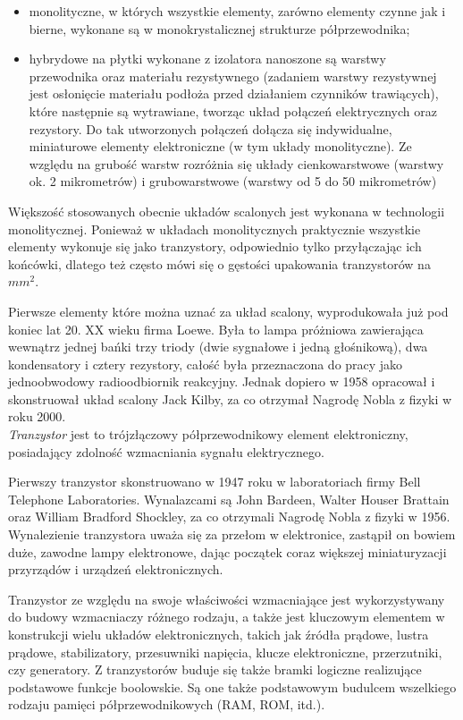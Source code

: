 \documentclass[a4paper,11pt]{article}
\begin{document}
\begin{itemize}
\item monolityczne, w których wszystkie elementy, zarówno elementy czynne jak i bierne, wykonane są w monokrystalicznej strukturze półprzewodnika;

\item hybrydowe na płytki wykonane z izolatora nanoszone są warstwy przewodnika oraz materiału rezystywnego (zadaniem warstwy rezystywnej jest osłonięcie materiału podłoża przed działaniem czynników trawiących), które następnie są wytrawiane, tworząc układ połączeń elektrycznych oraz rezystory. Do tak utworzonych połączeń dołącza się indywidualne, miniaturowe elementy elektroniczne (w tym układy monolityczne). Ze względu na grubość warstw rozróżnia się układy cienkowarstwowe (warstwy ok. 2 mikrometrów) i grubowarstwowe (warstwy od 5 do 50 mikrometrów)
\end{itemize}

Większość stosowanych obecnie układów scalonych jest wykonana w technologii monolitycznej. Ponieważ w układach monolitycznych praktycznie wszystkie elementy wykonuje się jako tranzystory, odpowiednio tylko przyłączając ich końcówki, dlatego też często mówi się o gęstości upakowania tranzystorów na $mm^2$.

Pierwsze elementy które można uznać za układ scalony, wyprodukowała już pod koniec lat 20. XX wieku firma Loewe. Była to lampa próżniowa zawierająca wewnątrz jednej bańki trzy triody (dwie sygnałowe i jedną głośnikową), dwa kondensatory i cztery rezystory, całość była przeznaczona do pracy jako jednoobwodowy radioodbiornik reakcyjny. Jednak dopiero w 1958 opracował i skonstruował układ scalony Jack Kilby, za co otrzymał Nagrodę Nobla z fizyki w roku 2000.\\

\emph{Tranzystor} jest to trójzłączowy półprzewodnikowy element elektroniczny, posiadający zdolność wzmacniania sygnału elektrycznego.

Pierwszy tranzystor skonstruowano w 1947 roku w laboratoriach firmy Bell Telephone Laboratories. Wynalazcami są John Bardeen, Walter Houser Brattain oraz William Bradford Shockley, za co otrzymali Nagrodę Nobla z fizyki w 1956. Wynalezienie tranzystora uważa się za przełom w elektronice, zastąpił on bowiem duże, zawodne lampy elektronowe, dając początek coraz większej miniaturyzacji przyrządów i urządzeń elektronicznych.

Tranzystor ze względu na swoje właściwości wzmacniające jest  wykorzystywany do budowy wzmacniaczy różnego rodzaju, a także jest kluczowym elementem w konstrukcji wielu układów elektronicznych, takich jak źródła prądowe, lustra prądowe, stabilizatory, przesuwniki napięcia, klucze elektroniczne, przerzutniki, czy generatory. Z tranzystorów buduje się także bramki logiczne realizujące podstawowe funkcje boolowskie. Są one także podstawowym budulcem wszelkiego rodzaju pamięci półprzewodnikowych (RAM, ROM, itd.).
\end{document}
